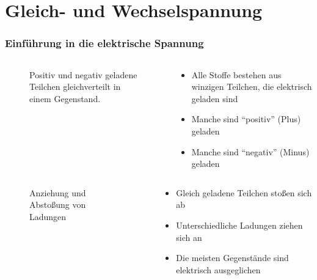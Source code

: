 
\section{Gleich- und  Wechselspannung}
\label{section:gleich_und_wechselspannung}
\begin{frame}%

\frametitle{Einführung in die elektrische Spannung}
\begin{columns}
    \begin{column}{0.48\textwidth}
    
\begin{figure}
    \caption{\scriptsize Positiv und negativ geladene Teilchen gleichverteilt in einem Gegenstand.}
    \label{n_frequenz_elektrische_ladungen}
\end{figure}


    \end{column}
   \begin{column}{0.48\textwidth}
       \begin{itemize}
  \item Alle Stoffe bestehen aus winzigen Teilchen, die elektrisch geladen sind
  \item Manche sind \enquote{positiv} (Plus) geladen
  \item Manche sind \enquote{negativ} (Minus) geladen
  \end{itemize}

   \end{column}
\end{columns}

\end{frame}

\begin{frame}
\begin{columns}
    \begin{column}{0.48\textwidth}
    
\begin{figure}
    \caption{\scriptsize Anziehung und Abstoßung von Ladungen}
    \label{n_ladungen}
\end{figure}


    \end{column}
   \begin{column}{0.48\textwidth}
       \begin{itemize}
  \item Gleich geladene Teilchen stoßen sich ab
  \item Unterschiedliche Ladungen ziehen sich an
  \item Die meisten Gegenstände sind elektrisch ausgeglichen
  \end{itemize}

   \end{column}
\end{columns}

\end{frame}

